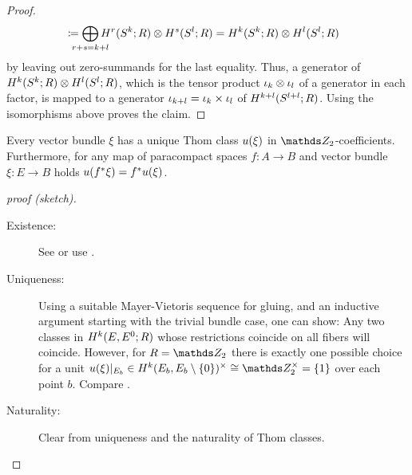 \begin{Cor}
\begin{proof}
\begin{align*}
      &\coloneqq
        \bigoplus_{\mathclap{r+s=\rkk+\rkl}}
        \H^r(\Sphere{\rkk};R)\otimes \H^s(\Sphere{\rkl};R)
        =
        \H^{\rkk}(\Sphere{\rkk};R)\otimes \H^{\rkl}(\Sphere{\rkl};R)
    \end{align*}
    by leaving out zero-summands for the last equality.
    Thus, a generator of
    $H^{k}(S^{k}; R)\otimes H^{l}(S^{l}; R)$,
    which is the tensor product $\iota_{k}\otimes\iota_{l}$ of a generator
    in each factor,
    is mapped to a generator $\iota_{k+l}=\iota_{k}\times\iota_{l}$ of
    $H^{k+l}(S^{l+l}; R)$.
    Using the isomorphisms above proves the claim.
  \end{proof}
\end{Cor}

\begin{Cor}
  Every vector bundle $\xi$ has a unique Thom class ${u}(\xi)$ in
  $\Zmod2$-coefficients.
  Furthermore, for any map of paracompact spaces $f\colon A\to B$ and
  vector bundle $\xi\colon E\to B$ holds ${u}({f}^* \xi) = {f}^* {u}(\xi)$.
  \begin{proof}[proof (sketch)]
    \begin{description}
    \item[Existence:] See \cite[Theorem~4D.10]{hatcher} or use
      \cite[Prop.~17.9.3]{tomdieck}.
    \item[Uniqueness:]
      Using a suitable Mayer-Vietoris sequence for gluing, and an
      inductive argument starting with the trivial bundle case, one can show:
      Any two classes in $H^{k}(E, {E}^0;R)$ whose
      restrictions coincide on all fibers will coincide.
      However, for $R=\Zmod2$ there is exactly one possible choice for
      a unit $\u{\xi}|_{E_b}\in
      \H^{\rkk}(\spherepair{E_b})^\times\cong\Zmod2^\times=\{1\}$
      over each point $b$.
      Compare \forexample \cite[Theorem~(17.9.4)]{tomdieck}.
    \item[Naturality:]
      Clear from uniqueness and the naturality of Thom classes.
    \end{description}
  \end{proof}
\end{Cor}

